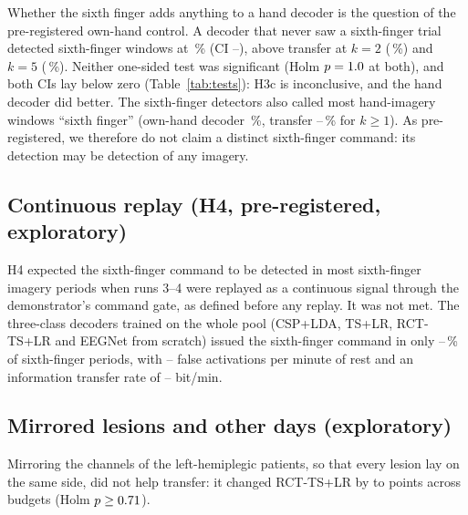 Whether the sixth finger adds anything to a hand decoder is the question of
the pre-registered own-hand control. A decoder that never saw a sixth-finger
trial detected sixth-finger windows at \rqThreeSfRestAhProxyMean\,\% (CI
\rqThreeSfRestAhProxyCiLo--\rqThreeSfRestAhProxyCiHi), above transfer at
$k = 2$ (\rqThreeSfRestRctTslrKTwoMean\,\%) and $k = 5$
(\rqThreeSfRestRctTslrKFiveMean\,\%). Neither one-sided test was significant
(Holm $p = 1.0$ at both), and both CIs lay below zero
(Table~\ref{tab:tests}): H3c is inconclusive, and the hand decoder did better.
The sixth-finger detectors also called most hand-imagery windows ``sixth
finger'' (own-hand decoder \rqThreeHandAsFingerAhProxy\,\%, transfer
\rqThreeHandAsFingerRctTslrKAll--\rqThreeHandAsFingerRctTslrKOne\,\% for
$k \geq 1$). As pre-registered, we therefore do not claim a distinct
sixth-finger command: its detection may be detection of any imagery.

\subsection{Continuous replay (H4, pre-registered, exploratory)}
H4 expected the sixth-finger command to be detected in most sixth-finger
imagery periods when runs 3--4 were replayed as a continuous signal through
the demonstrator's command gate, as defined before any replay. It was not
met. The three-class decoders trained on the whole pool (CSP+LDA, TS+LR,
RCT-TS+LR and EEGNet from scratch) issued the sixth-finger command in only
\rqFourReplayFingerDetectMin--\rqFourReplayFingerDetectMax\,\% of
sixth-finger periods, with \rqFourReplayFalsePerMinMin--\rqFourReplayFalsePerMinMax{}
false activations per minute of rest and an information transfer rate of
\rqFourReplayItrMin--\rqFourReplayItrMax{} bit/min.

\subsection{Mirrored lesions and other days (exploratory)}
Mirroring the channels of the left-hemiplegic patients, so that every lesion
lay on the same side, did not help transfer: it changed RCT-TS+LR by
\rqFourMirrorRctTslrDiffMin{} to \rqFourMirrorRctTslrDiffMax{} points across
budgets (Holm $p \geq 0.71$).

